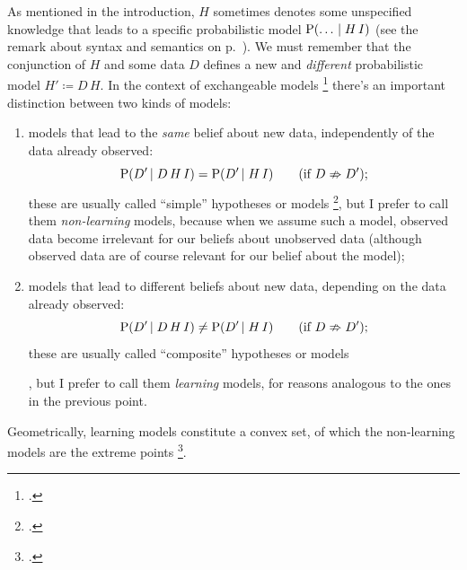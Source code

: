 \documentclass[\ifafour a4paper,12pt,\else a5paper,10pt,\fi%
onecolumn,oneside,article,%
british%
]{memoir}
\theoremstyle{remark}
\theoremstyle{innote}
\newcommand*{\citep}{\footcites}
\newcommand*{\defd}{\coloneqq}
\newcommand*{\p}{\mathrm{P}}%
\renewcommand*{\|}[1][]{\nonscript\,#1\vert\nonscript\;\mathopen{}}
\newcommand*{\sect}{\S}%
\newcommand*{\yK}{I}
\begin{document}
As mentioned in the introduction, $H$ sometimes denotes some unspecified
knowledge that leads to a specific probabilistic model
$\p(\dotso \| H \, \yK)$ (see the remark about syntax and semantics on
p.~\pageref{note:syntax}). We must remember that the conjunction of $H$ and
some data $D$  defines a new and \emph{different} probabilistic model
$H' \defd D \, H$. In the context of exchangeable models
\citep[\sect~4.2]{bernardoetal1994_r2000}{dawid2013,definetti1937,kingman1978,kochetal1982}[see
also][]{diaconisetal1980} there's an important distinction between two
kinds of models:
\begin{enumerate}[label=(\alph*)]
\item models that lead to the \emph{same} belief about new data,
  independently of the data already observed:
  \begin{equation}
  \label{eq:irrelevance_data}
  \p(D' \| D \, H \, \yK) = \p(D' \| H \, \yK)
  \qquad\text{(if $D \nRightarrow D'$)};
\end{equation}
these are usually called \enquote{simple} hypotheses or models
\citep[\sect~6.1.4]{bernardoetal1994_r2000}, but I prefer to call them
\emph{non-learning} models, because when we assume such a model, observed
data become irrelevant for our beliefs about unobserved data (although
observed data are of course relevant for our belief about the model);
\item models that lead to different beliefs about new data, depending on
  the data already observed:
  \begin{equation}
  \label{eq:irrelevance_data}
  \p(D' \| D \, H \, \yK) \ne \p(D' \| H \, \yK)
  \qquad\text{(if $D \nRightarrow D'$)};
\end{equation}
these are usually called \enquote{composite} hypotheses or models\addtocounter{footnote}{-1}\footnotemark{},%
but I prefer to call them \emph{learning} models, for reasons analogous to
the ones in the previous point.
\end{enumerate}
Geometrically, learning models constitute a convex set, of which the
non-learning models are the extreme points
\footcites{lauritzen1974,lauritzen1982_r1988,lauritzen1984,barndorffnielsen1978_r2014,dynkin1978}[gives
a terse summary]{dawid2013}.
\end{document}
